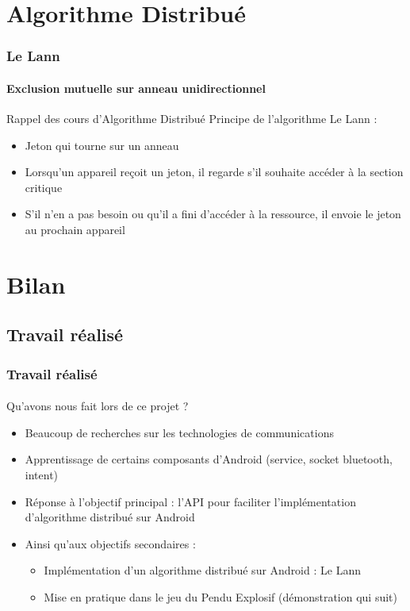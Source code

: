 \documentclass{beamer}
\begin{document}
  \section{Algorithme Distribué}
  \begin{frame}
    \frametitle{Le Lann}
    \framesubtitle{Exclusion mutuelle sur anneau unidirectionnel}
    \begin{block}{Rappel des cours d'Algorithme Distribué}
      Principe de l'algorithme Le Lann :
      \begin{itemize}
        \item Jeton qui tourne sur un anneau
        \item Lorsqu'un appareil reçoit un jeton, il regarde s'il souhaite accéder à la section critique
        \item S'il n'en a pas besoin ou qu'il a fini d'accéder à la ressource, il envoie le jeton au prochain appareil
      \end{itemize}
    \end{block}
  \end{frame}
  
  \section{Bilan}
    \subsection{Travail réalisé}
    \begin{frame}
      \frametitle{Travail réalisé}
      \framesubtitle{}
      \begin{block}{Qu'avons nous fait lors de ce projet ?}
        \begin{itemize}
          \item Beaucoup de recherches sur les technologies de communications
          \item Apprentissage de certains composants d'Android (service, socket bluetooth, intent)
          \item Réponse à l'objectif principal : l'API pour faciliter l'implémentation d'algorithme distribué sur Android
          \item Ainsi qu'aux objectifs secondaires :
          \begin{itemize}
            \item Implémentation d'un algorithme distribué sur Android : Le Lann
            \item Mise en pratique dans le jeu du Pendu Explosif (démonstration qui suit)
          \end{itemize}
        \end{itemize}
      \end{block}
    \end{frame}
\end{document}

